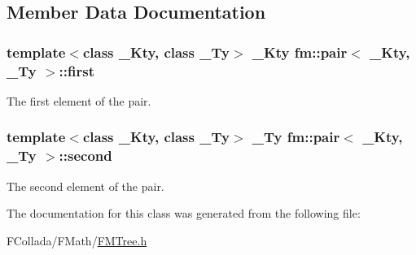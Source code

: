 \subsection{Member Data Documentation}
\hypertarget{classfm_1_1pair_afc22e37d084f7a4e731a297b72b3efd7}{
\subsubsection[{first}]{\setlength{\rightskip}{0pt plus 5cm}template$<$class \_\-Kty, class \_\-Ty$>$ \_\-Kty {\bf fm::pair}$<$ \_\-Kty, \_\-Ty $>$::{\bf first}}}
\label{classfm_1_1pair_afc22e37d084f7a4e731a297b72b3efd7}
The first element of the pair. \hypertarget{classfm_1_1pair_a80c0b96ba80f34765fd06b0899506977}{
\subsubsection[{second}]{\setlength{\rightskip}{0pt plus 5cm}template$<$class \_\-Kty, class \_\-Ty$>$ \_\-Ty {\bf fm::pair}$<$ \_\-Kty, \_\-Ty $>$::{\bf second}}}
\label{classfm_1_1pair_a80c0b96ba80f34765fd06b0899506977}
The second element of the pair. 

The documentation for this class was generated from the following file:\begin{DoxyCompactItemize}
\item 
FCollada/FMath/\hyperlink{FMTree_8h}{FMTree.h}\end{DoxyCompactItemize}

